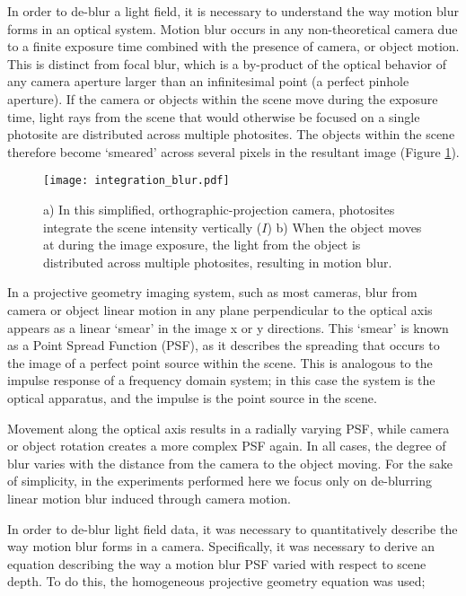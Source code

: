 In order to de-blur a light field, it is necessary to understand the way motion blur forms in an optical system.
Motion blur occurs in any non-theoretical camera due to a finite exposure time combined with the presence of camera, or object motion.
This is distinct from focal blur, which is a by-product of the optical behavior of any camera aperture larger than an infinitesimal point (a perfect pinhole aperture).
If the camera or objects within the scene move during the exposure time, light rays from the scene that would otherwise be focused on a single photosite are distributed across multiple photosites.
The objects within the scene therefore become \enquote*{smeared} across several pixels in the resultant image (Figure \ref{fig:integration_blur}).

\begin{figure}[h]
\centering
\texttt{[image: integration\_blur.pdf]}
\caption[Motion Blur Caused by Camera Integration]{
a) In this simplified, orthographic-projection camera, photosites integrate the scene intensity vertically ($I$) b) When the object moves at during the image exposure, the light from the object is distributed across multiple photosites, resulting in motion blur.
}
\label{fig:integration_blur}
\end{figure}

In a projective geometry imaging system, such as most cameras, blur from camera or object linear motion in any plane perpendicular to the optical axis appears as a linear \enquote*{smear} in the image x or y directions.
This \enquote*{smear} is known as a Point Spread Function (PSF), as it describes the spreading that occurs to the image of a perfect point source within the scene.
This is analogous to the impulse response of a frequency domain system; in this case the system is the optical apparatus, and the impulse is the point source in the scene.

Movement along the optical axis results in a radially varying PSF, while camera or object rotation creates a more complex PSF again.
In all cases, the degree of blur varies with the distance from the camera to the object moving.
For the sake of simplicity, in the experiments performed here we focus only on de-blurring linear motion blur induced through camera motion.

In order to de-blur light field data, it was necessary to quantitatively describe the way motion blur forms in a camera.
Specifically, it was necessary to derive an equation describing the way a motion blur PSF varied with respect to scene depth.
To do this, the homogeneous projective geometry equation was used;

